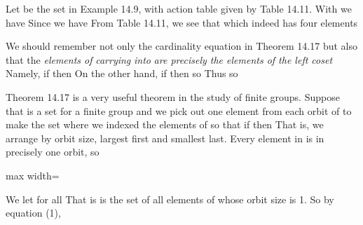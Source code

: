 \documentclass[11pt,oneside]{article}
\begin{document}
\begin{BookBody}

 Let  be the set in Example 14.9, with action table given by Table 14.11. With  we have  Since  we have  From Table 14.11, we see that  which indeed has four elements\BookEnd{\blacktriangle}

We should remember not only the cardinality equation in Theorem 14.17 but also that the\textit{ elements of}  \textit{carrying}  \textit{into}  \textit{are precisely the elements of the left coset}  Namely, if  then  On the other hand, if  then  so  Thus  so 


\noindent Theorem 14.17 is a very useful theorem in the study of finite groups. Suppose that  is a set for a finite group  and we pick out one element from each orbit of  to make the set  where we indexed the elements of  so that if  then  That is, we arrange by orbit size, largest first and smallest last. Every element in  is in precisely one orbit, so

\begin{center}\begin{adjustbox}{max width=\linewidth}\end{adjustbox}\end{center}

\noindent We let  for all  That is is the set of all elements of  whose orbit size is 1. So by equation (1),


\end{BookBody}
\end{document}
